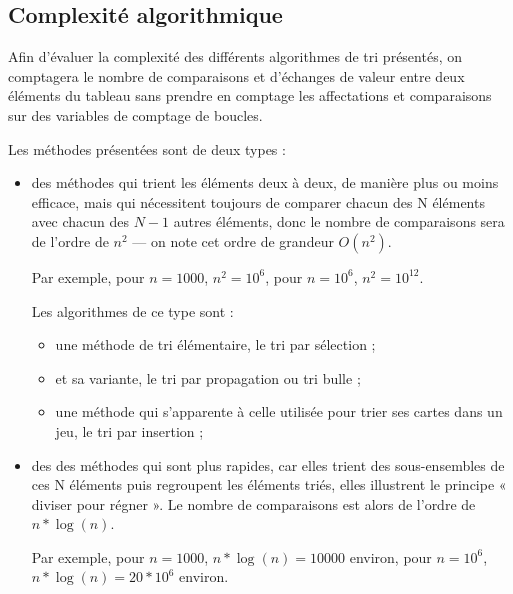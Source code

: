 \documentclass[11pt,a4paper]{article}
\begin{document}
\newpage
\subsection{Complexité algorithmique}
Afin d’évaluer la complexité des différents algorithmes de tri présentés,
on comptagera le nombre de comparaisons et d’échanges de valeur entre deux
éléments du tableau sans prendre en comptage les affectations et comparaisons
sur des variables de comptage de boucles.\\
\vspace{0.1cm}

Les méthodes présentées sont de deux types :
\begin{itemize}
    \item des méthodes qui trient les éléments deux à deux, de manière plus ou moins
          efficace, mais qui nécessitent toujours de comparer chacun des N éléments avec
          chacun des $N-1$ autres éléments, donc le nombre de comparaisons sera de l’ordre
          de $n^2$ — on note cet ordre de grandeur $\displaystyle{O(n^2)}$.
          \vspace{0.1cm}

          Par exemple, pour $n=1000$, $n^2=10^6$, pour $n=10^6$, $n^2=10^{12}$.
          \vspace{0.2cm}

          Les algorithmes de ce type sont :
          \begin{itemize}
              \item une méthode de tri élémentaire, le tri par sélection ;
              \item et sa variante, le tri par propagation ou tri bulle ;
              \item une méthode qui s’apparente à celle utilisée pour trier ses cartes dans un jeu, le tri par insertion ;
          \end{itemize}
          \vspace{0.2cm}

    \item des des méthodes qui sont plus rapides, car elles trient des sous-ensembles de ces N éléments puis regroupent les
          éléments triés, elles illustrent le principe « diviser pour régner ». Le nombre de comparaisons est alors de l’ordre de
          $n*\log(n)$.
          \vspace{0.1cm}

          Par exemple, pour $n=1000$, $n*\log(n)=10000$ environ, pour ${n=10^6}$, $n*\log(n)=20*10^6$ environ.
          \vspace{0.2cm}


\end{itemize}
\end{document}
